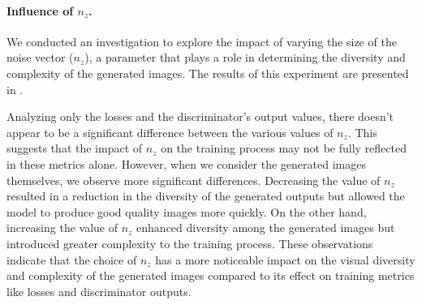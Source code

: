 \paragraph*{Influence of $n_z$.}
We conducted an investigation to explore the impact of varying the size of the noise vector ($n_z$), a parameter that plays a role in determining the diversity and complexity of the generated images. The results of this experiment are presented in .

Analyzing only the losses and the discriminator's output values, there doesn't appear to be a significant difference between the various values of $n_z$. This suggests that the impact of $n_z$ on the training process may not be fully reflected in these metrics alone. However, when we consider the generated images themselves, we observe more significant differences. Decreasing the value of $n_z$ resulted in a reduction in the diversity of the generated outputs but allowed the model to produce good quality images more quickly. On the other hand, increasing the value of $n_z$ enhanced diversity among the generated images but introduced greater complexity to the training process. These observations indicate that the choice of $n_z$ has a more noticeable impact on the visual diversity and complexity of the generated images compared to its effect on training metrics like losses and discriminator outputs.

